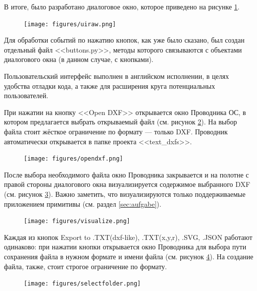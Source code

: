 В итоге, было разработано диалоговое окно, которое приведено на рисунке \ref{fig:uiraw}.

\begin{figure}[H]
	\centering
	\texttt{[image: figures/uiraw.png]}
	\label{fig:uiraw}
\end{figure}

Для обработки событий по нажатию кнопок, как уже было сказано, был создан отдельный файл <<buttons.py>>, методы которого связываются с объектами диалогового окна (в данном случае, с кнопками).

Пользовательский интерфейс выполнен в английском исполнении, в целях удобства отладки кода, а также для расширения круга потенциальных пользователей.

При нажатии на кнопку <<Open DXF>> открывается окно Проводника ОС, в котором предлагается выбрать открываемый файл (см. рисунок \ref{fig:opendxf}). На выбор файла стоит жёсткое ограничение по формату --- только DXF. Проводник автоматически открывается в папке проекта <<text\_dxfs>>.

\begin{figure}[H]
	\centering
	\texttt{[image: figures/opendxf.png]}
	\label{fig:opendxf}
\end{figure}

После выбора необходимого файла окно Проводника закрывается и на полотне с правой стороны диалогового окна визуализируется содержимое выбранного DXF (см. рисунок \ref{fig:visualize}). Важно заметить, что визуализируются только поддерживаемые приложением примитивы (см. раздел \ref{sec:aufgabe}).

\begin{figure}[H]
	\centering
	\texttt{[image: figures/visualize.png]}
	\label{fig:visualize}
\end{figure}

Каждая из кнопок Export to .TXT(dxf-like), .TXT(x,y,r), .SVG, .JSON работают одинаково: при нажатии кнопки открывается окно Проводника для выбора пути сохранения файла в нужном формате и имени файла (см. рисунок \ref{fig:selectfolder}). На создание файла, также, стоит строгое ограничение по формату.

\begin{figure}[H]
	\centering
	\texttt{[image: figures/selectfolder.png]}
	\label{fig:selectfolder}
\end{figure}

